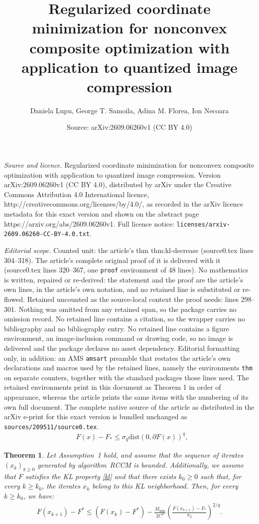 \documentclass[10pt,a4paper]{amsart}
\title{Regularized coordinate minimization for nonconvex composite optimization with application to quantized image compression}
\author{Daniela Lupu, George T. Samoila, Adina M. Florea, Ion Necoara}
\date{Source: arXiv:2609.06260v1 (CC BY 4.0)}
\newtheorem{thm}{Theorem}
\begin{document}
\maketitle

\noindent\emph{Source and licence.} Regularized coordinate minimization for nonconvex composite optimization with application to quantized image compression. Version arXiv:2609.06260v1 (CC BY 4.0), distributed by arXiv under the Creative Commons Attribution 4.0 International licence, http://creativecommons.org/licenses/by/4.0/, as recorded in the arXiv licence metadata for this exact version and shown on the abstract page https://arxiv.org/abs/2609.06260v1. Full licence notice: \texttt{licenses/arxiv-2609.06260-CC-BY-4.0.txt}.\par\smallskip

\noindent\textit{Editorial scope.} Counted unit: the article's thm thm:kl-decrease (source0.tex lines 304--318). The article's complete original proof of it is delivered with it (source0.tex lines 320--367, one \texttt{proof} environment of 48 lines). No mathematics is written, repaired or re-derived: the statement and the proof are the article's own lines, in the article's own notation, and no retained line is substituted or re-flowed.  Retained uncounted as the source-local context the proof needs: lines 298--301.  Nothing was omitted from any retained span, so the package carries no omission record.  No retained line contains a citation, so the wrapper carries no bibliography and no bibliography entry.  No retained line contains a figure environment, an image-inclusion command or drawing code, so no image is delivered and the package declares no asset dependency.  Editorial formatting only, in addition: an AMS \texttt{amsart} preamble that restates the article's own declarations and macros used by the retained lines, namely the environments \texttt{thm} on separate counters, together with the standard packages those lines need.  The retained environments print in this document as Theorem 1 in order of appearance, whereas the article prints the same items with the numbering of its own full document.  The complete native source of the article as distributed in the arXiv e-print for this exact version is bundled unchanged as \texttt{sources/209511/source0.tex}.
	\begin{align}
    \label{kl}
		& 	F(x) - F_*  \leq \sigma_q \text{dist}(0, \partial  F(x))^q,  
	\end{align}

\begin{thm}
\label{thm:kl-decrease}
Let Assumption~1 hold, and assume that the sequence of iterates $({x_k})_{k\geq 0}$ generated by algorithm~RCCM is bounded. Additionally, we assume that $F$ satisfies the KL property \eqref{kl} and  that there exists $k_0\geq 0$ such that, for every $k\geq k_0$, the iterates $x_{k}$ belong to this KL neighborhood. Then, for every $k\geq k_0$, we have:
\begin{align}
\label{eq:kl-decrease-final}
F(x_{k+1}) \!- \!F^*
\!\leq\!
(F(x_k)
-F^*)\! -\!
\frac{M_{\min}}{2C^2}
\left(\!
\frac{F(x_{k+1})-F_*}{\sigma_q}
\!\right)^{2/q}  .
\end{align}
\end{thm}
\end{document}
